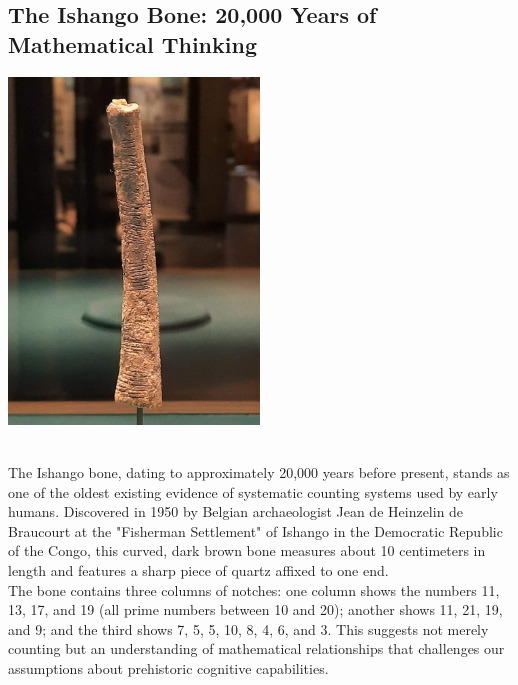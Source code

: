 \documentclass[12pt, oneside, openany]{book}
\begin{document}
\subsection{The Ishango Bone: 20,000 Years of Mathematical Thinking}
\begin{center}
		\includegraphics[width=0.5\textwidth]{../images/part-1/Ishango_bone.jpg}
\end{center}
\\
The Ishango bone, dating to approximately 20,000 years before present, stands as one of the oldest existing evidence of systematic counting systems used by early humans. Discovered in 1950 by Belgian archaeologist Jean de Heinzelin de Braucourt at the "Fisherman Settlement" of Ishango in the Democratic Republic of the Congo, this curved, dark brown bone measures about 10 centimeters in length and features a sharp piece of quartz affixed to one end.\\
The bone contains three columns of notches: one column shows the numbers 11, 13, 17, and 19 (all prime numbers between 10 and 20); another shows 11, 21, 19, and 9; and the third shows 7, 5, 5, 10, 8, 4, 6, and 3. This suggests not merely counting but an understanding of mathematical relationships that challenges our assumptions about prehistoric cognitive capabilities.\\
\end{document}
